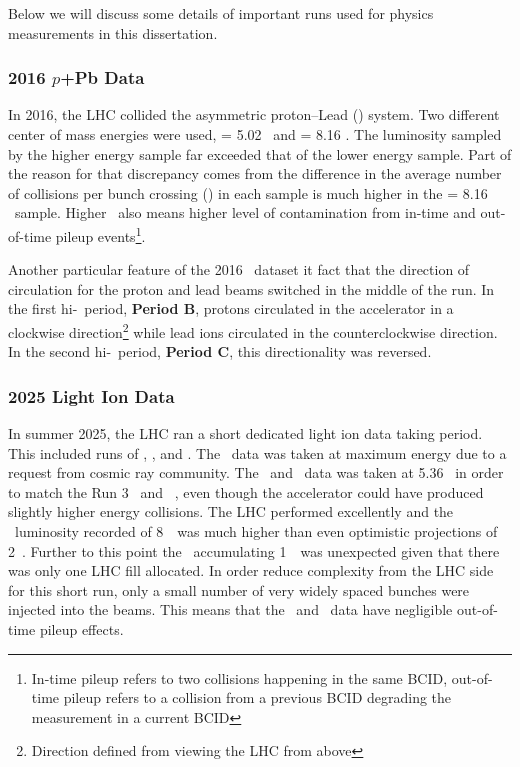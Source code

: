 Below we will discuss some details of important runs used for physics measurements in this dissertation.

\subsubsection{2016 \texorpdfstring{$p$}{p}+Pb Data}
\label{sec:LHCpPbRun}
In 2016, the LHC collided the asymmetric proton--Lead (\pxPb) system.
Two different center of mass energies were used, \SNN = 5.02 \TeV\ and \SNN = 8.16 \TeV.
The luminosity sampled by the higher energy sample far exceeded that of the lower energy sample.  Part of the reason for that discrepancy comes from the difference in the average number of collisions per bunch crossing (\avmu) in each sample is much higher in the \SNN = 8.16 \TeV\ sample.
Higher \avmu\ also means higher level of contamination from in-time and out-of-time pileup events\footnote{In-time pileup refers to two collisions happening in the same BCID, out-of-time pileup refers to a collision from a previous BCID degrading the measurement in a current BCID}.

Another particular feature of the 2016 \pxPb\ dataset it fact that the direction of circulation for the proton and lead beams switched in the middle of the run.  In the first hi-\avmu\ period, \textbf{Period B}, protons circulated in the accelerator in a clockwise direction\footnote{Direction defined from viewing the LHC from above} while lead ions circulated in the counterclockwise direction.  In the second hi-\avmu\ period, \textbf{Period C}, this directionality was reversed.

\subsubsection{2025 Light Ion Data}
In summer 2025, the LHC ran a short dedicated light ion data taking period.
This included runs of \pxO, \OxO, and \NexNe.
The \pxO\ data was taken at maximum energy due to a request from cosmic ray community.
The \OxO\ and \NexNe\ data was taken at 5.36 \TeV\ in order to match the Run 3 \PbxPb\ and \pxp\ \SNN, even though the accelerator could have produced slightly higher energy collisions.
The LHC performed excellently and the \OxO\ luminosity recorded of 8~\NB\ was much higher than even optimistic projections of 2~\NB.
Further to this point the \NexNe\ accumulating 1~\NB\ was unexpected given that there was only one LHC fill allocated.
In order reduce complexity from the LHC side for this short run, only a small number of very widely spaced bunches were injected into the beams.
This means that the \OxO\ and \NexNe\ data have negligible out-of-time pileup effects.
